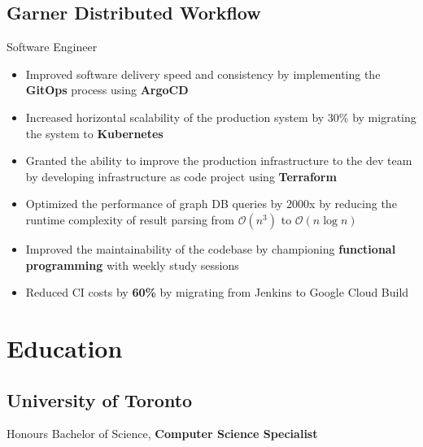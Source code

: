 \documentclass[letterpaper,12pt,oneside]{article}
\begin{document}
\subsection*{Garner Distributed Workflow \hfill {}}
Software Engineer
\begin{itemize}
    \setlength\itemsep{0em}
    \item Improved software delivery speed and consistency by implementing the \textbf{GitOps} process using \textbf{ArgoCD}
    \item Increased horizontal scalability of the production system by 30\% by migrating the system to \textbf{Kubernetes}
    \item Granted the ability to improve the production infrastructure to the dev team by developing infrastructure as code project using \textbf{Terraform}
    \item Optimized the performance of graph DB queries by 2000x by reducing the runtime complexity of result parsing from $\mathcal{O}(n^3)$ to $\mathcal{O}(n\log{}n)$
    \item Improved the maintainability of the codebase by championing \textbf{functional programming} with weekly study sessions
    \item Reduced CI costs by \textbf{60\%} by migrating from Jenkins to Google Cloud Build
\end{itemize}

\section*{Education}
\subsection*{University of Toronto \hfill {}}
Honours Bachelor of Science, \textbf{Computer Science Specialist}
\end{document}
